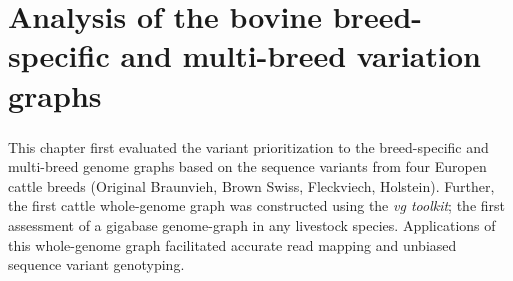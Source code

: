 \documentclass[11 pt, a4paper, notitlepage, twoside]{report}
\begin{document}
\begin{center}\end{center}




\iftwoside
\cleardoublepage
\newpage
\fi



\chapter[Bovine whole-genome variation graphs]{\LARGE{Analysis of the bovine breed-specific and multi-breed variation graphs}}
\label{chap:wholegraph}

\subsection*{}
\normalsize
This chapter first evaluated the variant prioritization to the breed-specific and multi-breed genome graphs based on the sequence variants from four Europen cattle breeds (Original Braunvieh, Brown Swiss, Fleckviech, Holstein). Further, the first cattle whole-genome graph was constructed using the \emph{vg toolkit}; the first assessment of a gigabase genome-graph in any livestock species. Applications of this whole-genome graph facilitated accurate read mapping and unbiased sequence variant genotyping. \\


\bigskip

\begin{center}\end{center}
\end{document}
